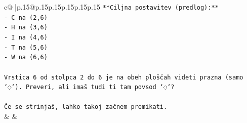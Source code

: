 \documentclass{article}
\begin{document}
{\begin{supertabular}{c@{$\;$}|p{.15\linewidth}@{}p{.15\linewidth}p{.15\linewidth}p{.15\linewidth}p{.15\linewidth}p{.15\linewidth}}
{{{\texttt{**Ciljna postavitev (predlog):**} \\
\texttt{{-} C na (2,6)} \\
\texttt{{-} H na (3,6)} \\
\texttt{{-} I na (4,6)} \\
\texttt{{-} T na (5,6)} \\
\texttt{{-} W na (6,6)} \\
\\ 
\texttt{Vrstica 6 od stolpca 2 do 6 je na obeh ploščah videti prazna (samo `◌`). Preveri, ali imaš tudi ti tam povsod `◌`?} \\
\\ 
\texttt{Če se strinjaš, lahko takoj začnem premikati.} \\
            }
        }
    }
    & & \\ \\


\end{supertabular}}
\end{document}
